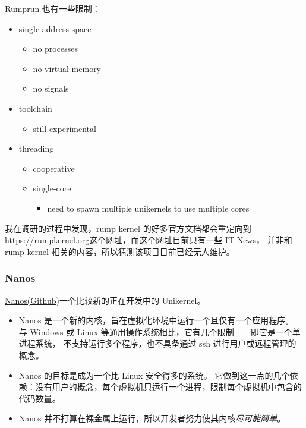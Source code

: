 \documentclass{../runikraft-report}
\begin{document}
Rumprun 也有一些限制：

\begin{itemize}
\item single address-space
    \begin{itemize}
    \item no processes
    \item no virtual memory
    \item no signals
    \end{itemize}
\item toolchain
    \begin{itemize}
    \item still experimental
    \end{itemize}
\item threading
    \begin{itemize}
    \item cooperative
    \item single-core
        \begin{itemize}
        \item need to spawn multiple unikernels to use multiple cores
        \end{itemize}
    \end{itemize}
\end{itemize}

我在调研的过程中发现，rump kernel 的好多官方文档都会重定向到
\url{https://rumpkernel.org}这个网址，而这个网址目前只有一些 IT News，
并非和 rump kernel 相关的内容，所以猜测该项目目前已经无人维护。

\subsubsection{Nanos}

\href{https://github.com/nanovms/nanos}{Nanos(Github)}一个比较新的正在开发中的 Unikernel。

\begin{itemize}
\item Nanos 是一个新的内核，旨在虚拟化环境中运行一个且仅有一个应用程序。
与 Windows 或 Linux 等通用操作系统相比，它有几个限制——即它是一个单进程系统，
不支持运行多个程序，也不具备通过 ssh 进行用户或远程管理的概念。
\item Nanos 的目标是成为一个比 Linux 安全得多的系统。
它做到这一点的几个依赖：没有用户的概念，每个虚拟机只运行一个进程，限制每个虚拟机中包含的代码数量。
\item Nanos 并不打算在裸金属上运行，所以开发者努力使其内核\textit{尽可能简单}。
\end{itemize}
\end{document}

